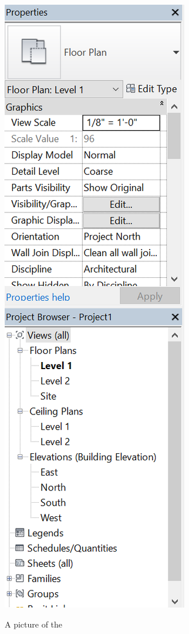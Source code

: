 \documentclass{tufte-book} %
\begin{document}
\begin{marginfigure}
	\includegraphics[width=\linewidth]{revitsidebar}
	\caption[The revit side bar]{A picture of the }
	\label{fig:revsidebar}
\end{marginfigure}
\end{document}
